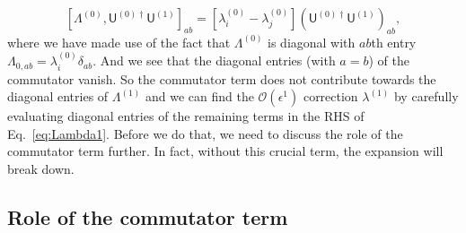 %
\begin{equation}
    \left[\Lambda^{(0)},\mathsf{U}^{(0)\dagger}\mathsf{U}^{(1)}\right]_{ab} = %
    \left[\lambda^{(0)}_{i} - \lambda^{(0)}_{j}\right]\left(\mathsf{U}^{(0)\dagger}\mathsf{U}^{(1)}\right)_{ab},
    \label{eq:diagonal}
\end{equation}
%
where we have made use of the fact that $\Lambda^{(0)}$ is diagonal with $ab$th entry $\Lambda_{0,ab} = \lambda^{(0)}_{i}\delta_{ab}$.
And we see that the diagonal entries (with $a=b$) of the commutator vanish.
So the commutator term does not contribute towards the diagonal entries of $\Lambda^{(1)}$ and we can find the $\mathcal{O}(\epsilon^{1})$ correction $\lambda^{(1)}$ by carefully evaluating diagonal entries of the remaining terms in the RHS of Eq.~\eqref{eq:Lambda1}.
Before we do that, we need to discuss the role of the commutator term further.
In fact, without this crucial term, the expansion will break down.

\subsection{Role of the commutator term}

